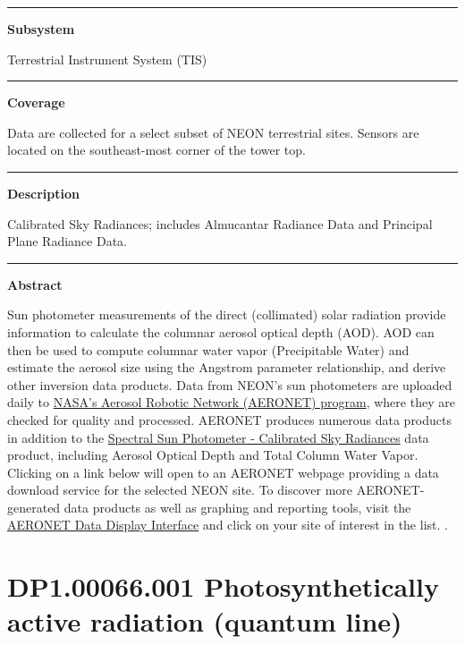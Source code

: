\documentclass[]{article}
\begin{document}
\begin{center}\rule{0.5\linewidth}{\linethickness}\end{center}

\textbf{Subsystem}

Terrestrial Instrument System (TIS)

\begin{center}\rule{0.5\linewidth}{\linethickness}\end{center}

\textbf{Coverage}

Data are collected for a select subset of NEON terrestrial sites.
Sensors are located on the southeast-most corner of the tower top.

\begin{center}\rule{0.5\linewidth}{\linethickness}\end{center}

\textbf{Description}

Calibrated Sky Radiances; includes Almucantar Radiance Data and
Principal Plane Radiance Data.

\begin{center}\rule{0.5\linewidth}{\linethickness}\end{center}

\textbf{Abstract}

Sun photometer measurements of the direct (collimated) solar radiation
provide information to calculate the columnar aerosol optical depth
(AOD). AOD can then be used to compute columnar water vapor
(Precipitable Water) and estimate the aerosol size using the Angstrom
parameter relationship, and derive other inversion data products. Data
from NEON's sun photometers are uploaded daily to
\href{https://aeronet.gsfc.nasa.gov/}{NASA's Aerosol Robotic Network
(AERONET) program}, where they are checked for quality and processed.
AERONET produces numerous data products in addition to the
\href{http://data.neonscience.org/data-product-view?dpCode=DP1.00043.001}{Spectral
Sun Photometer - Calibrated Sky Radiances} data product, including
Aerosol Optical Depth and Total Column Water Vapor. Clicking on a link
below will open to an AERONET webpage providing a data download service
for the selected NEON site. To discover more AERONET-generated data
products as well as graphing and reporting tools, visit the
\href{https://aeronet.gsfc.nasa.gov/cgi-bin/type_piece_of_map_aod_v3}{AERONET
Data Display Interface} and click on your site of interest in the list.
\newpage
.

\section{DP1.00066.001 Photosynthetically active radiation (quantum
line)}\label{dp1.00066.001-photosynthetically-active-radiation-quantum-line}
\end{document}
